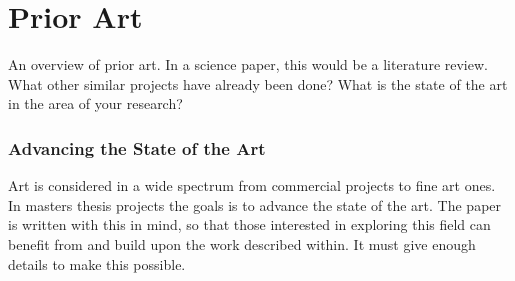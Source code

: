 \chapter {Prior Art}
An overview of prior art. In a science paper, this would be a literature review. What other  similar projects have already been done? What is the state of the art in the area of your
research?
\subsection{Advancing the State of the Art}
Art is considered in a wide spectrum from commercial projects to fine art ones. In masters thesis projects the goals is to advance the state of the art. The paper is written with this in mind, so that those interested in exploring this field can benefit from and build upon the work described within. It must give enough details to make this possible.